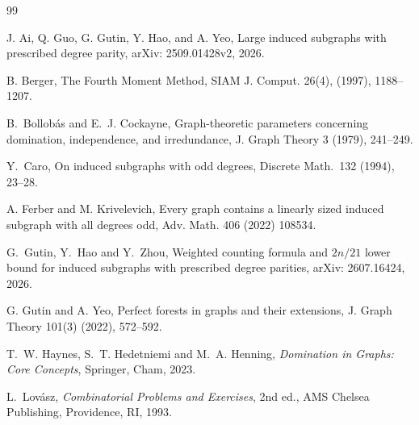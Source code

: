 \documentclass[11pt]{article}
\theoremstyle{definition}
\theoremstyle{remark}
\newcommand{\1}{\mathbf{1}}
\begin{document}
	\begin{thebibliography}{99}
		
		
		
		
		
		 J. Ai, Q. Guo, G. Gutin, Y. Hao, and A. Yeo, Large induced subgraphs with prescribed degree parity, arXiv: 2509.01428v2, 2026.
		
		 B. Berger, The Fourth Moment Method, SIAM J. Comput. 26(4), (1997), 1188--1207.
		
		
		B.~Bollob\'as and E.~J. Cockayne,
		Graph-theoretic parameters concerning domination, independence,
		and irredundance,
		J. Graph Theory 3 (1979), 241--249.
		
Y.~Caro, On induced subgraphs with odd degrees,
Discrete Math.\ 132 (1994), 23--28.

		
		 A. Ferber and M. Krivelevich, Every graph contains a linearly sized induced subgraph with all degrees odd, Adv. Math. 406 (2022) 108534. 
		
		
		
		G.~Gutin, Y.~Hao and Y.~Zhou,
		\newblock Weighted counting formula and $2n/21$ lower bound for induced
		subgraphs with prescribed degree parities,
		\newblock arXiv: 2607.16424, 2026.
		
		 G. Gutin and A. Yeo, Perfect forests in graphs and their extensions, J. Graph Theory 101(3) (2022), 572--592.  
		
		T.~W. Haynes, S.~T. Hedetniemi and M.~A. Henning,
		\emph{Domination in Graphs: Core Concepts},
		Springer, Cham, 2023.
		
		
		
		
		
		
		L.~Lov\'asz,
		\emph{Combinatorial Problems and Exercises}, 2nd ed.,
		AMS Chelsea Publishing, Providence, RI, 1993.
		
		
		

\end{thebibliography}
\end{document}
